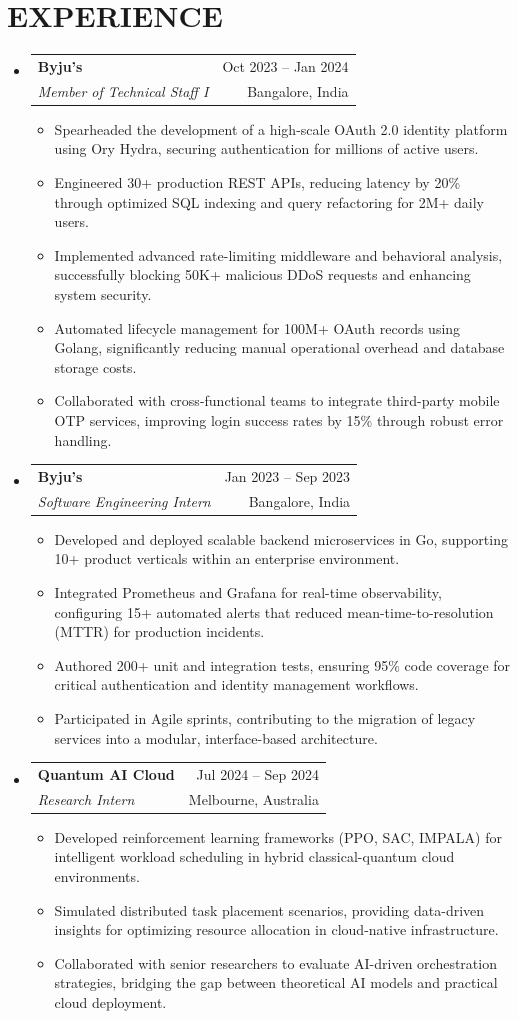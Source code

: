 \documentclass[letterpaper,11pt]{article}
\makeatletter
\newcommand{\resumeItem}[1]{\item\small{{#1 \vspace{-1pt}}}}
\newcommand{\resumeSubheading}[4]{
  \vspace{-1pt}\item
    \begin{tabular*}{\textwidth}[t]{l@{\extracolsep{\fill}}r}
      \textbf{#1} & {\color{dark-grey}\small #2}\vspace{1pt}\\
      \textit{#3} & {\color{dark-grey} \small #4}\\
    \end{tabular*}\vspace{-4pt}
}
\newcommand{\resumeSubHeadingListStart}{\begin{itemize}[leftmargin=0in, label={}]}
\newcommand{\resumeSubHeadingListEnd}{\end{itemize}}
\newcommand{\resumeItemListStart}{\begin{itemize}}
\newcommand{\resumeItemListEnd}{\end{itemize}\vspace{0pt}}
\makeatother
\begin{document}
\section{EXPERIENCE}
\resumeSubHeadingListStart
\resumeSubheading{Byju’s}{Oct 2023 -- Jan 2024}{Member of Technical Staff I}{Bangalore, India}
\resumeItemListStart
\resumeItem{Spearheaded the development of a high-scale OAuth 2.0 identity platform using Ory Hydra, securing authentication for millions of active users.}
\resumeItem{Engineered 30+ production REST APIs, reducing latency by 20\% through optimized SQL indexing and query refactoring for 2M+ daily users.}
\resumeItem{Implemented advanced rate-limiting middleware and behavioral analysis, successfully blocking 50K+ malicious DDoS requests and enhancing system security.}
\resumeItem{Automated lifecycle management for 100M+ OAuth records using Golang, significantly reducing manual operational overhead and database storage costs.}
\resumeItem{Collaborated with cross-functional teams to integrate third-party mobile OTP services, improving login success rates by 15\% through robust error handling.}
\resumeItemListEnd

\resumeSubheading{Byju’s}{Jan 2023 -- Sep 2023}{Software Engineering Intern}{Bangalore, India}
\resumeItemListStart
\resumeItem{Developed and deployed scalable backend microservices in Go, supporting 10+ product verticals within an enterprise environment.}
\resumeItem{Integrated Prometheus and Grafana for real-time observability, configuring 15+ automated alerts that reduced mean-time-to-resolution (MTTR) for production incidents.}
\resumeItem{Authored 200+ unit and integration tests, ensuring 95\% code coverage for critical authentication and identity management workflows.}
\resumeItem{Participated in Agile sprints, contributing to the migration of legacy services into a modular, interface-based architecture.}
\resumeItemListEnd

\resumeSubheading{Quantum AI Cloud}{Jul 2024 -- Sep 2024}{Research Intern}{Melbourne, Australia}
\resumeItemListStart
\resumeItem{Developed reinforcement learning frameworks (PPO, SAC, IMPALA) for intelligent workload scheduling in hybrid classical-quantum cloud environments.}
\resumeItem{Simulated distributed task placement scenarios, providing data-driven insights for optimizing resource allocation in cloud-native infrastructure.}
\resumeItem{Collaborated with senior researchers to evaluate AI-driven orchestration strategies, bridging the gap between theoretical AI models and practical cloud deployment.}
\resumeItemListEnd
\resumeSubHeadingListEnd
\end{document}
